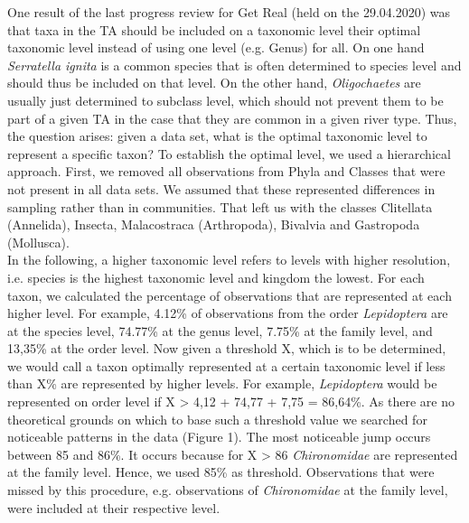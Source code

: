 \documentclass{article}
\begin{document}
	One result of the last progress review for Get Real (held on the 29.04.2020) was that taxa in the TA should be included on a taxonomic level their optimal taxonomic level instead of using one level (e.g. Genus) for all. On one hand \textit{Serratella ignita} is a common species that is often determined to species level and should thus be included on that level. On the other hand, \textit{Oligochaetes} are usually just determined to subclass level, which should not prevent them to be part of a given TA in the case that they are common in a given river type. Thus, the question arises: given a data set, what is the optimal taxonomic level to represent a specific taxon?  
	To establish the optimal level, we used a hierarchical approach. First, we removed all observations from Phyla and Classes that were not present in all data sets. We assumed that these represented differences in sampling rather than in communities. That left us with the classes Clitellata (Annelida), Insecta, Malacostraca (Arthropoda), Bivalvia and Gastropoda (Mollusca). \\
	In the following, a higher taxonomic level refers to levels with higher resolution, i.e. species is the highest taxonomic level and kingdom the lowest. For each taxon, we calculated the percentage of observations that are represented at each higher level. For example, 4.12\% of observations from the order \textit{Lepidoptera} are at the species level, 74.77\% at the genus level, 7.75\% at the family level, and 13,35\% at the order level. Now given a threshold X, which is to be determined, we would call a taxon optimally represented at a certain taxonomic level if less than X\% are represented by higher levels. For example, \textit{Lepidoptera} would be represented on order level if X > 4,12 + 74,77 + 7,75 = 86,64\%. As there are no theoretical grounds on which to base such a threshold value we searched for noticeable patterns in the data (Figure 1). The most noticeable jump occurs between 85 and 86\%. It occurs because for X > 86 \textit{Chironomidae} are represented at the family level. Hence, we used 85\% as threshold. Observations that were missed by this procedure, e.g. observations of \textit{Chironomidae} at the family level, were included at their respective level.    
	
	
\end{document}

